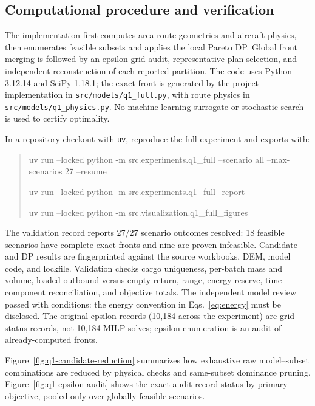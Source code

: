 \documentclass[11pt,a4paper]{article}
\begin{document}
\subsection{Computational procedure and verification}
The implementation first computes area route geometries and aircraft physics, then enumerates feasible subsets and applies the local Pareto DP. Global front merging is followed by an epsilon-grid audit, representative-plan selection, and independent reconstruction of each reported partition. The code uses Python 3.12.14 and SciPy 1.18.1; the exact front is generated by the project implementation in \texttt{src/models/q1\_full.py}, with route physics in \texttt{src/models/q1\_physics.py}. No machine-learning surrogate or stochastic search is used to certify optimality.

In a repository checkout with \texttt{uv}, reproduce the full experiment and exports with:
\begin{quote}\small\ttfamily\raggedright
uv run --locked python -m src.experiments.q1\_full --scenario all --max-scenarios 27 --resume\par
uv run --locked python -m src.experiments.q1\_full\_report\par
uv run --locked python -m src.visualization.q1\_full\_figures
\end{quote}

The validation record reports 27/27 scenario outcomes resolved: 18 feasible scenarios have complete exact fronts and nine are proven infeasible. Candidate and DP results are fingerprinted against the source workbooks, DEM, model code, and lockfile. Validation checks cargo uniqueness, per-batch mass and volume, loaded outbound versus empty return, range, energy reserve, time-component reconciliation, and objective totals. The independent model review passed with conditions: the energy convention in Eqs.~\eqref{eq:energy} must be disclosed. The original epsilon records (10,184 across the experiment) are grid status records, not 10,184 MILP solves; epsilon enumeration is an audit of already-computed fronts.

Figure~\ref{fig:q1-candidate-reduction} summarizes how exhaustive raw model--subset combinations are reduced by physical checks and same-subset dominance pruning. Figure~\ref{fig:q1-epsilon-audit} shows the exact audit-record status by primary objective, pooled only over globally feasible scenarios.
\end{document}
